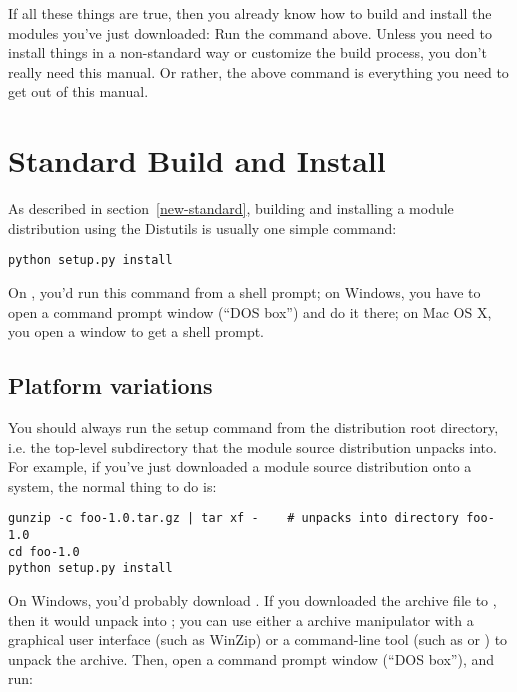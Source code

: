 \documentclass{howto}
\begin{document}
If all these things are true, then you already know how to build and
install the modules you've just downloaded:  Run the command above.
Unless you need to install things in a non-standard way or customize the
build process, you don't really need this manual.  Or rather, the above
command is everything you need to get out of this manual.


\section{Standard Build and Install}
\label{standard-install}

As described in section~\ref{new-standard}, building and installing
a module distribution using the Distutils is usually one simple command:

\begin{verbatim}
python setup.py install
\end{verbatim}

On \UNIX, you'd run this command from a shell prompt; on Windows, you
have to open a command prompt window (``DOS box'') and do it there; on
Mac OS X, you open a  window to get a shell prompt.


\subsection{Platform variations}
\label{platform-variations}

You should always run the setup command from the distribution root
directory, i.e. the top-level subdirectory that the module source
distribution unpacks into.  For example, if you've just downloaded a
module source distribution  onto a
\UNIX{} system, the normal thing to do is:

\begin{verbatim}
gunzip -c foo-1.0.tar.gz | tar xf -    # unpacks into directory foo-1.0
cd foo-1.0
python setup.py install
\end{verbatim}

On Windows, you'd probably download .  If you
downloaded the archive file to , then it
would unpack into ;
you can use either a archive manipulator with a graphical user interface
(such as WinZip) or a command-line tool (such as  or
) to unpack the archive.  Then, open a command prompt
window (``DOS box''), and run:
\end{document}
